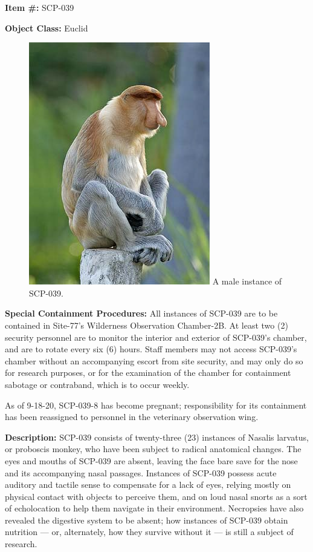 
\textbf{Item \#:} SCP-039

\textbf{Object Class:} Euclid

\begin{figure}[h]
\begin{center}
\includegraphics[scale=0.45]{scp/039.jpg}
\linebreak A male instance of SCP-039.
\end{center}
\end{figure}

\textbf{Special Containment Procedures:} All instances of SCP-039 are to be contained in Site-77's Wilderness Observation Chamber-2B. At least two (2) security personnel are to monitor the interior and exterior of SCP-039's chamber, and are to rotate every six (6) hours. Staff members may not access SCP-039's chamber without an accompanying escort from site security, and may only do so for research purposes, or for the examination of the chamber for containment sabotage or contraband, which is to occur weekly.

As of 9-18-20, SCP-039-8 has become pregnant; responsibility for its containment has been reassigned to personnel in the veterinary observation wing.

\textbf{Description:} SCP-039 consists of twenty-three (23) instances of Nasalis larvatus, or proboscis monkey, who have been subject to radical anatomical changes. The eyes and mouths of SCP-039 are absent, leaving the face bare save for the nose and its accompanying nasal passages. Instances of SCP-039 possess acute auditory and tactile sense to compensate for a lack of eyes, relying mostly on physical contact with objects to perceive them, and on loud nasal snorts as a sort of echolocation to help them navigate in their environment. Necropsies have also revealed the digestive system to be absent; how instances of SCP-039 obtain nutrition — or, alternately, how they survive without it — is still a subject of research.

